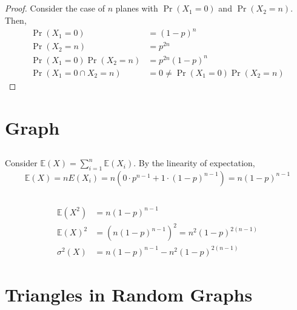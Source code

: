 \documentclass{article}
\newcommand{\E}{\mathbb{E}}
\begin{document}
\subsection{}

\begin{proof}
    Consider the case of \(n\) planes with \(\Pr(X_1 = 0)\) and \(\Pr(X_2 = n)\).
    Then,
    \begin{align}
        \Pr(X_1 = 0) &= (1 - p)^n \\
        \Pr(X_2 = n) &= p^{2n} \\
        \Pr(X_1 = 0) \Pr(X_2 = n) &= p^{2n} (1 - p)^n \\
        \Pr(X_1 = 0 \cap X_2 = n) &= 0 \neq \Pr(X_1 = 0) \Pr(X_2 = n)
    \end{align}
\end{proof}

\section{Graph}

\subsection{}

Consider \(\E(X) = \sum_{i = 1}^n \E(X_i)\).
By the linearity of expectation,
\begin{equation}
    \E(X) = n E(X_i) = n (0 \cdot p^{n - 1} + 1 \cdot (1 - p)^{n - 1}) = n (1 - p)^{n - 1}
\end{equation}

\subsection{}

\begin{align}
    \E(X^2) &= n (1 - p)^{n - 1} \\
    \E(X)^2 &= \left(n (1 - p)^{n - 1}\right)^2 = n^2 (1 - p)^{2 (n - 1)} \\
    \sigma^2(X) &= n (1 - p)^{n - 1} - n^2 (1 - p)^{2 (n - 1)}
\end{align}

\section{Triangles in Random Graphs}
\end{document}
